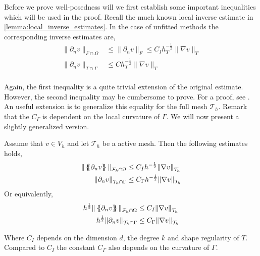 Before we prove well-posedness will we first establish some important inequalities which will be used in the proof.
Recall the much known local inverse estimate in \ref{lemma:local_inverse_estimates}. In the case of unfitted methods the corresponding inverse estimates are,
\begin{equation}
\label{eq:unfitted_localinv}
\begin{split}
    \| \partial _{n} v \|_{ F\cap \Omega  }^{  } & \le \| \partial _{n}  v \|_{F  }^{  } \le  C_{I} h_{T} ^{-\frac{1}{2}} \| \nabla v \|_{ T }^{  } \\
    \| \partial _{n} v \|_{ T\cap \Gamma   }^{  } &  \le  C h_{T} ^{-\frac{1}{2}} \| \nabla v \|_{ T }^{  } \\
\end{split}
\end{equation}


Again, the first inequality is a quite trivial extension of the original estimate. However, the second inequality may be cumbersome to prove. For a proof, see \cite{hansbo2003finite}.
An useful extension is to generalize this equality for the full mesh $\mathcal{T} _{h}$.
Remark that the $C_{\Gamma } $ is dependent on the local curvature of $\Gamma $. 
We will now present a slightly generalized version.
\begin{corollary}
    \label{cor:unfitted_inverse_estimates}
    Assume that $v \in V_{h} $ and let $\mathcal{T}_{h} $ be a active mesh. Then the following estimates holds,
    \[
\begin{split}
    \| \left\{\!\!\left\{ \partial _{n} v \right\}\!\!\right\}   \|_{ \mathcal{F}_h \cap \Omega  }^{  } & \le   C_{I} h ^{-\frac{1}{2}} \| \nabla v \|_{ \mathcal{T}_{h}  }^{  } \\
    \| \partial _{n} v \|_{ \mathcal{T}_{h} \cap \Gamma   }^{  } &  \le  C_{\Gamma } h ^{-\frac{1}{2}} \| \nabla v \|_{ \mathcal{T} _{h} }^{  } \\
\end{split}
    \]
    Or equivalently,
    \[
\begin{split}
    h^{\frac{1}{2}}\| \left\{\!\!\left\{ \partial _{n} v \right\}\!\!\right\} \|_{ \mathcal{F}_h \cap \Omega  }^{  } & \le  C_{I}  \| \nabla v \|_{ \mathcal{T}_{h}  }^{  } \\
    h^{\frac{1}{2}}\| \partial _{n} v \|_{ \mathcal{T}_{h} \cap \Gamma   }^{  } &  \le  C_{\Gamma }  \| \nabla v \|_{ \mathcal{T} _{h} }^{  } \\
\end{split}
    \]

Where $C_{I}$ depends on the dimension $d$, the degree $k$ and shape regularity of $T$. Compared to $C_{I}$ the constant $C_{\Gamma }$ also depends on the curvature of $\Gamma $.
\end{corollary}


